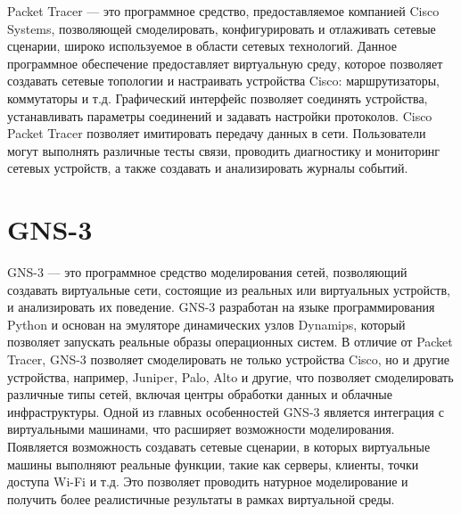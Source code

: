 Packet Tracer — это программное средство, предоставляемое компанией
Cisco Systems, позволяющей смоделировать, конфигурировать и отлаживать
сетевые сценарии, широко используемое в области сетевых
технологий. Данное программное обеспечение предоставляет виртуальную
среду, которое позволяет создавать сетевые топологии и настраивать
устройства Cisco: маршрутизаторы, коммутаторы и т.д. Графический
интерфейс позволяет соединять устройства, устанавливать параметры
соединений и задавать настройки протоколов. Cisco Packet Tracer
позволяет имитировать передачу данных в сети. Пользователи могут
выполнять различные тесты связи, проводить диагностику и мониторинг
сетевых устройств, а также создавать и анализировать журналы событий.

\section{GNS-3}
\label{chap1:sec5}


GNS-3 — это программное средство моделирования сетей, позволяющий
создавать виртуальные сети, состоящие из реальных или виртуальных
устройств, и анализировать их поведение. GNS-3 разработан на языке
программирования Python и основан на эмуляторе динамических узлов
Dynamips, который позволяет запускать реальные образы операционных
систем. В отличие от Packet Tracer, GNS-3 позволяет смоделировать не
только устройства Cisco, но и другие устройства, например, Juniper,
Palo, Alto и другие, что позволяет смоделировать различные типы сетей,
включая центры обработки данных и облачные инфраструктуры. Одной из
главных особенностей GNS-3 является интеграция с виртуальными
машинами, что расширяет возможности моделирования. Появляется
возможность создавать сетевые сценарии, в которых виртуальные машины
выполняют реальные функции, такие как серверы, клиенты, точки доступа
Wi-Fi и т.д. Это позволяет проводить натурное моделирование и
получить более реалистичные результаты в рамках виртуальной среды.




